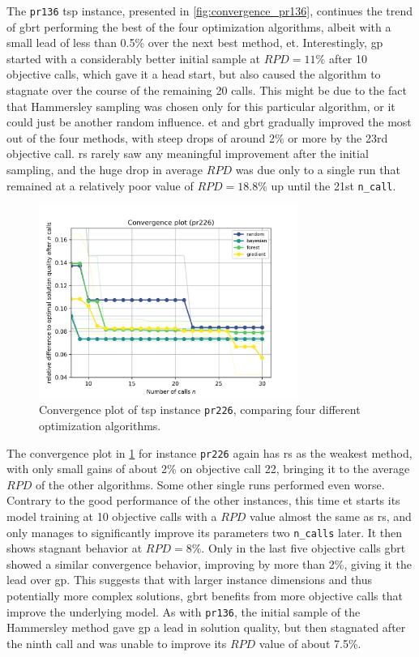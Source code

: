 The \texttt{pr136} \gls{tsp} instance, presented in \cref{fig:convergence_pr136}, continues the trend of \gls{gbrt} performing the best of the four optimization algorithms, albeit with a small lead of less than 0.5\% over the next best method, \gls{et}. Interestingly, \gls{gp} started with a considerably better initial sample at $RPD = 11\%$ after 10 objective calls, which gave it a head start, but also caused the algorithm to stagnate over the course of the remaining 20 calls. This might be due to the fact that Hammersley sampling was chosen only for this particular algorithm, or it could just be another random influence. \gls{et} and \gls{gbrt} gradually improved the most out of the four methods, with steep drops of around 2\% or more by the 23rd objective call. \gls{rs} rarely saw any meaningful improvement after the initial sampling, and the huge drop in average $RPD$ was due only to a single run that remained at a relatively poor value of $RPD = 18.8\%$ up until the 21st \texttt{n\_call}.

\begin{figure}[h]
	\centering
	\includegraphics[width=0.75\textwidth]{results/part1/convergence_pr226.png}
	\caption[Convergence plot of \gls{tsp} instance \texttt{pr226}]{Convergence plot of \gls{tsp} instance \texttt{pr226}, comparing four different optimization algorithms.}
	\label{fig:convergence_pr226}
\end{figure}

The convergence plot in \cref{fig:convergence_pr226} for instance \texttt{pr226} again has \gls{rs} as the weakest method, with only small gains of about 2\% on objective call 22, bringing it to the average $RPD$ of the other algorithms. Some other single runs performed even worse. Contrary to the good performance of the other instances, this time \gls{et} starts its model training at 10 objective calls with a $RPD$ value almost the same as \gls{rs}, and only manages to significantly improve its parameters two \texttt{n\_calls} later. It then shows stagnant behavior at $RPD = 8\%$. Only in the last five objective calls \gls{gbrt} showed a similar convergence behavior, improving by more than 2\%, giving it the lead over \gls{gp}. This suggests that with larger instance dimensions and thus potentially more complex solutions, \gls{gbrt} benefits from more objective calls that improve the underlying model.
As with \texttt{pr136}, the initial sample of the Hammersley method gave \gls{gp} a lead in solution quality, but then stagnated after the ninth call and was unable to improve its $RPD$ value of about 7.5\%.

